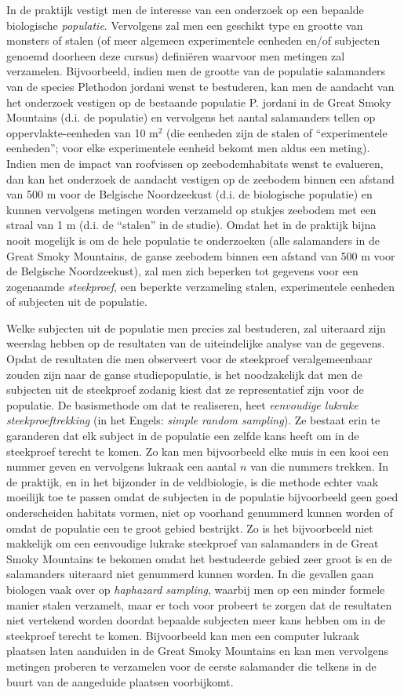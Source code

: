 \documentclass[12pt,dutch,coursenotes]{book}
\theoremstyle{definition}
\theoremstyle{definition}
\theoremstyle{definition}
\theoremstyle{remark}
\begin{document}
In de praktijk vestigt men de interesse van een onderzoek op een
bepaalde biologische \emph{populatie}. Vervolgens zal men een geschikt
type en grootte van monsters of stalen (of meer algemeen experimentele
eenheden en/of subjecten genoemd doorheen deze cursus) definiëren
waarvoor men metingen zal verzamelen. Bijvoorbeeld, indien men de
grootte van de populatie salamanders van de species Plethodon jordani
wenst te bestuderen, kan men de aandacht van het onderzoek vestigen op
de bestaande populatie P. jordani in de Great Smoky Mountains (d.i. de
populatie) en vervolgens het aantal salamanders tellen op
oppervlakte-eenheden van 10 m\(^2\) (die eenheden zijn de stalen of
``experimentele eenheden''; voor elke experimentele eenheid bekomt men
aldus een meting). Indien men de impact van roofvissen op
zeebodemhabitats wenst te evalueren, dan kan het onderzoek de aandacht
vestigen op de zeebodem binnen een afstand van 500 m voor de Belgische
Noordzeekust (d.i. de biologische populatie) en kunnen vervolgens
metingen worden verzameld op stukjes zeebodem met een straal van 1 m
(d.i. de ``stalen'' in de studie). Omdat het in de praktijk bijna nooit
mogelijk is om de hele populatie te onderzoeken (alle salamanders in de
Great Smoky Mountains, de ganse zeebodem binnen een afstand van 500 m
voor de Belgische Noordzeekust), zal men zich beperken tot gegevens voor
een zogenaamde \emph{steekproef}, een beperkte verzameling stalen,
experimentele eenheden of subjecten uit de populatie.

Welke subjecten uit de populatie men precies zal bestuderen, zal
uiteraard zijn weerslag hebben op de resultaten van de uiteindelijke
analyse van de gegevens. Opdat de resultaten die men observeert voor de
steekproef veralgemeenbaar zouden zijn naar de ganse studiepopulatie, is
het noodzakelijk dat men de subjecten uit de steekproef zodanig kiest
dat ze representatief zijn voor de populatie. De basismethode om dat te
realiseren, heet \emph{eenvoudige lukrake steekproeftrekking} (in het
Engels: \emph{simple random sampling}). Ze bestaat erin te garanderen
dat elk subject in de populatie een zelfde kans heeft om in de
steekproef terecht te komen. Zo kan men bijvoorbeeld elke muis in een
kooi een nummer geven en vervolgens lukraak een aantal \(n\) van die
nummers trekken. In de praktijk, en in het bijzonder in de veldbiologie,
is die methode echter vaak moeilijk toe te passen omdat de subjecten in
de populatie bijvoorbeeld geen goed onderscheiden habitats vormen, niet
op voorhand genummerd kunnen worden of omdat de populatie een te groot
gebied bestrijkt. Zo is het bijvoorbeeld niet makkelijk om een
eenvoudige lukrake steekproef van salamanders in de Great Smoky
Mountains te bekomen omdat het bestudeerde gebied zeer groot is en de
salamanders uiteraard niet genummerd kunnen worden. In die gevallen gaan
biologen vaak over op \emph{haphazard sampling}, waarbij men op een
minder formele manier stalen verzamelt, maar er toch voor probeert te
zorgen dat de resultaten niet vertekend worden doordat bepaalde
subjecten meer kans hebben om in de steekproef terecht te komen.
Bijvoorbeeld kan men een computer lukraak plaatsen laten aanduiden in de
Great Smoky Mountains en kan men vervolgens metingen proberen te
verzamelen voor de eerste salamander die telkens in de buurt van de
aangeduide plaatsen voorbijkomt.
\end{document}
